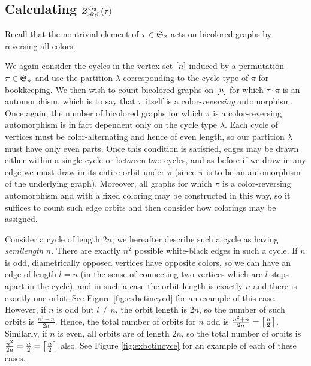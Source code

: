 \documentclass[distribution,draft]{brandiss} %
\numberwithin{section}{chapter}
\numberwithin{figure}{chapter}
\begin{document}
\subsection{Calculating $\gcielt{\symgp{2}}{\specname{BC}}{\tau}$}\label{ss:tcibc}
Recall that the nontrivial element of $\tau \in \symgp{2}$ acts on bicolored graphs by reversing all colors.

We again consider the cycles in the vertex set $\sbrac{n}$ induced by a permutation $\pi \in \symgp{n}$ and use the partition $\lambda$ corresponding to the cycle type of $\pi$ for bookkeeping.
We then wish to count bicolored graphs on $\sbrac{n}$ for which $\tau \cdot \pi$ is an automorphism, which is to say that $\pi$ itself is a color-\emph{reversing} automorphism.
Once again, the number of bicolored graphs for which $\pi$ is a color-reversing automorphism is in fact dependent only on the cycle type $\lambda$.
Each cycle of vertices must be color-alternating and hence of even length, so our partition $\lambda$ must have only even parts.
Once this condition is satisfied, edges may be drawn either within a single cycle or between two cycles, and as before if we draw in any edge we must draw in its entire orbit under $\pi$ (since $\pi$ is to be an automorphism of the underlying graph).
Moreover, all graphs for which $\pi$ is a color-reversing automorphism and with a fixed coloring may be constructed in this way, so it suffices to count such edge orbits and then consider how colorings may be assigned.

Consider a cycle of length $2n$; we hereafter describe such a cycle as having \emph{semilength} $n$.
There are exactly $n^{2}$ possible white-black edges in such a cycle.
If $n$ is odd, diametrically opposed vertices have opposite colors, so we can have an edge of length $l = n$ (in the sense of connecting two vertices which are $l$ steps apart in the cycle), and in such a case the orbit length is exactly $n$ and there is exactly one orbit.
See Figure \ref{fig:exbctincycd} for an example of this case.
However, if $n$ is odd but $l \neq n$, the orbit length is $2n$, so the number of such orbits is $\frac{n^{2} - n}{2n}$.
Hence, the total number of orbits for $n$ odd is $\frac{n^2 + n}{2n} = \ceil{\frac{n}{2}}$.
Similarly, if $n$ is even, all orbits are of length $2n$, so the total number of orbits is $\frac{n^{2}}{2n} = \frac{n}{2} = \ceil{\frac{n}{2}}$ also.
See Figure \ref{fig:exbctincyce} for an example of each of these cases.
\end{document}

